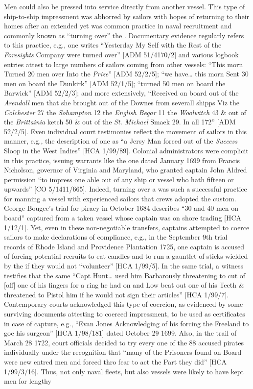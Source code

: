 Men could also be pressed into service directly from another vessel. This type of ship-to-ship impressment was abhorred by  sailors with hopes of returning to their homes after an extended  yet was common practice in naval recruitment and commonly known as “turning over” the . Documentary evidence regularly refers to this practice, e.g., one  writes “Yesterday My Self with the Rest of the \textit{Foresights} Company were turned over” [ADM 51/4170/2] and various logbook entries attest to large numbers of sailors coming from other vessels: “This morn Turned 20 men over Into the \textit{ Prize}” [ADM 52/2/5]; “we have… this morn Sent 30 men on board the Dunkirk” [ADM 52/1/5]; “turned 50 men on board the Barwick” [ADM 52/2/3]; and more extensively, “Received on board out of the \textit{Arendall} men that she brought out of the Downes from severall shipps Viz the \textit{Colchester} 27 the \textit{Sohampton} 12 the \textit{English Begar} 11 the \textit{Woolwitch} 43 \& out of the \textit{Brittainia} ketch 50 \& out of the \textit{St. Michael} Smaek 29. In all 172” [ADM 52/2/5]. Even individual court testimonies reflect the movement of sailors in this manner, e.g., the description of one  as “a Jersy Man forced out of the \textit{Success} Sloop in the West Indies” [HCA 1/99/89]. Colonial administrators were complicit in this practice, issuing warrants like the one dated January {1699} from Francis Nicholson, governor of Virginia and Maryland, who granted captain John Aldred permission “to impress one able  out of any ship or vessel who hath fifteen  or upwards” [CO 5/1411/665]. Indeed, turning over a  was such a successful practice for manning a vessel with experienced sailors that  crews adopted the custom. George Bougee’s trial for piracy in October {1684} describes “30 and 40 men on board” captured from a taken vessel whose captain was on shore trading [HCA 1/12/1]. Yet, even in these non-negotiable transfers, captains attempted to coerce sailors to make declarations of compliance, e.g., in the September 9th trial records of Rhode Island and Providence Plantation 1725, one  captain is accused of forcing potential recruits to eat candles and to run a gauntlet of sticks wielded by the  if they would not “volunteer” [HCA 1/99/5]. In the same trial, a witness testifies that the same “Capt Hunt… used him Barbarously threatening to cut of [off] one of his fingers for a ring he had on and Low beat out one of his Teeth \& threatened to Pistol him if he would not sign their articles” [HCA 1/99/7]. Contemporary courts acknowledged this type of coercion, as evidenced by some surviving documents attesting to coerced impressment, to be used as certificates in case of capture, e.g., “Evan Jones Acknowledging of his forcing the Freeland to goe his surgeon” [HCA 1/98/181] dated October 29 1699. Also, in the trail of March 28 1722, court officials decided to try every one of the 88 accused pirates individually under the recognition that “many of the Prisoners found on Board were new entred men and forced thro fear to act the Part they did” [HCA 1/99/3/16]. Thus, not only naval fleets, but also  vessels were likely to have kept men for lengthy 